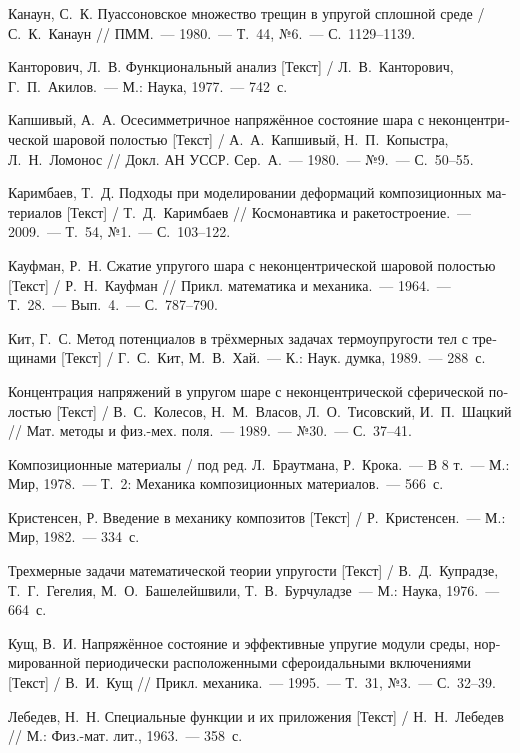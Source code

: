 \begin{russian}
\begin{biblist}{99}
Канаун, С.~К. 
Пуассоновское множество трещин в упругой сплошной среде  
/ С.~К.~Канаун 
// ПММ.~--- 1980.~--- Т.~44, №6.~--- С.~1129--1139.

Канторович, Л.~В. 
Функциональный анализ [Текст] / Л.~В.~Канторович, Г.~П.~Акилов.~--- М.: Наука, 1977.~--- 742~с.

Капшивый, А.~А. 
Осесимметричное напряжённое состояние шара с неконцентрической шаровой полостью [Текст] 
/ А.~А.~Капшивый, Н.~П.~Копыстра, Л.~Н.~Ломонос 
// Докл. АН УССР. Сер.~А.~--- 1980.~--- №9.~--- С.~50--55.

Каримбаев, Т.~Д. 
Подходы при моделировании деформаций композиционных материалов [Текст] / Т.~Д.~Каримбаев 
// Космонавтика и ракетостроение.~--- 2009.~--- Т.~54, №1.~--- С.~103--122.

Кауфман, Р.~Н. 
Сжатие упругого шара с неконцентрической шаровой полостью [Текст] 
/ Р.~Н.~Кауфман 
// Прикл. математика и механика.~--- 1964.~--- Т.~28.~--- Вып.~4.~--- С.~787--790.

Кит, Г.~С. 
Метод потенциалов в трёхмерных задачах термоупругости тел с трещинами [Текст] 
/ Г.~С.~Кит, М.~В.~Хай.~--- К.: Наук. думка, 1989.~--- 288~с.

Концентрация напряжений в упругом шаре с неконцентрической сферической полостью [Текст] 
/ В.~С.~Колесов, Н.~М.~Власов, Л.~О.~Тисовский, И.~П.~Шацкий 
// Мат. методы и физ.-мех. поля.~--- 1989.~--- №30.~--- С.~37--41.

Композиционные материалы 
/ под ред. Л.~Браутмана, Р.~Крока.~--- В 8 т.~--- М.: Мир, 1978.~--- Т.~2: Механика композиционных материалов.~--- 566~с.

Кристенсен, Р. 
Введение в механику композитов [Текст] 
/ Р.~Кристенсен.~--- М.: Мир, 1982.~--- 334~с.

Трехмерные задачи математической теории упругости [Текст] 
/ В.~Д.~Купрадзе, Т.~Г.~Гегелия, М.~О.~Башелейшвили, Т.~В.~Бурчуладзе~--- М.: Наука, 1976.~--- 664~с.

Кущ, В.~И. 
Напряжённое состояние и эффективные упругие модули среды, нормированной периодически расположенными сфероидальными включениями [Текст] 
/ В.~И.~Кущ 
// Прикл. механика.~--- 1995.~--- Т.~31, №3.~--- С.~32--39.

Лебедев, Н.~Н. 
Специальные функции и их приложения [Текст] 
/ Н.~Н.~Лебедев
// М.: Физ.-мат. лит., 1963.~--- 358~с.


\end{biblist}
\end{russian}
